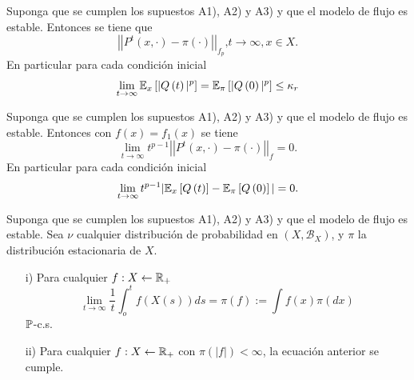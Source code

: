 \begin{Teo}\label{Tma.6.2}
Suponga que se cumplen los supuestos A1), A2) y A3) y que el
modelo de flujo es estable. Entonces se tiene que
\begin{equation}
|\left|P^{t}\left(x,\cdot\right)-\pi\left(\cdot\right)\right||_{f_{p}}\textrm{,
}t\rightarrow\infty,x\in X.
\end{equation}
En particular para cada condici\'on inicial
\begin{eqnarray*}
\lim_{t\rightarrow\infty}\mathbb{E}_{x}\left[|Q\left(t\right)|^{p}\right]=\mathbb{E}_{\pi}\left[|Q\left(0\right)|^{p}\right]\leq\kappa_{r}
\end{eqnarray*}
\end{Teo}
\begin{Teo}\label{Tma.6.3}
Suponga que se cumplen los supuestos A1), A2) y A3) y que el
modelo de flujo es estable. Entonces con
$f\left(x\right)=f_{1}\left(x\right)$ se tiene
\begin{equation}
\lim_{t\rightarrow\infty}t^{p-1}|\left|P^{t}\left(x,\cdot\right)-\pi\left(\cdot\right)\right||_{f}=0.
\end{equation}
En particular para cada condici\'on inicial
\begin{eqnarray*}
\lim_{t\rightarrow\infty}t^{p-1}|\mathbb{E}_{x}\left[Q\left(t\right)\right]-\mathbb{E}_{\pi}\left[Q\left(0\right)\right]|=0.
\end{eqnarray*}
\end{Teo}

\begin{Teo}\label{Tma.6.4}
Suponga que se cumplen los supuestos A1), A2) y A3) y que el
modelo de flujo es estable. Sea $\nu$ cualquier distribuci\'on de
probabilidad en $\left(X,\mathcal{B}_{X}\right)$, y $\pi$ la
distribuci\'on estacionaria de $X$.
\begin{itemize}
\item[i)] Para cualquier $f:X\leftarrow\mathbb{R}_{+}$
\begin{equation}
\lim_{t\rightarrow\infty}\frac{1}{t}\int_{o}^{t}f\left(X\left(s\right)\right)ds=\pi\left(f\right):=\int
f\left(x\right)\pi\left(dx\right)
\end{equation}
$\mathbb{P}$-c.s. \item[ii)] Para cualquier $f:X\leftarrow\mathbb{R}_{+}$ con
$\pi\left(|f|\right)<\infty$, la ecuaci\'on anterior se cumple.
\end{itemize}
\end{Teo}

%
%


